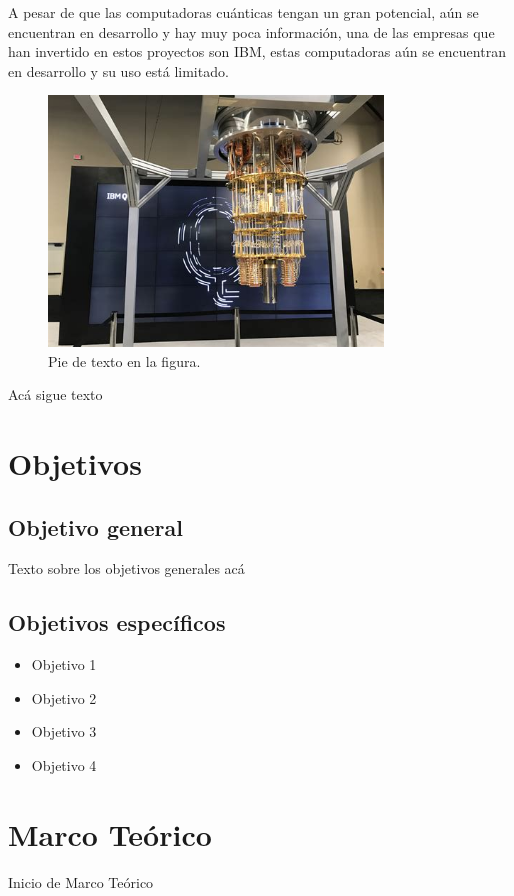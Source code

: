 \documentclass{article}
\begin{document}
A pesar de que las computadoras cuánticas tengan un gran potencial, aún se encuentran en desarrollo y hay muy poca información, una de las empresas que han invertido en estos proyectos son IBM, estas computadoras aún se encuentran en desarrollo y su uso está limitado.   

\begin{figure}[htb]
    \centering
    \includegraphics[width=3.5in]{quantum,.jpg}
    \caption{Pie de texto en la figura.}
    \label{fig:quantum}
\end{figure}


Acá sigue texto


\section{Objetivos}

\subsection{Objetivo general}
Texto sobre los objetivos generales acá

\subsection{Objetivos específicos}

\begin{itemize}
	\item Objetivo 1
	\item Objetivo 2
	\item Objetivo 3
	\item Objetivo 4
\end{itemize}

\section{Marco Teórico}
Inicio de Marco Teórico
\end{document}
